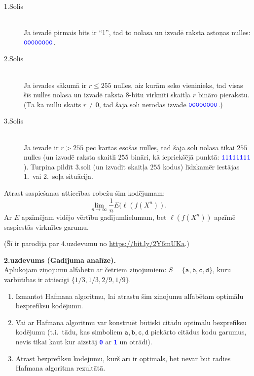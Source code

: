 \documentclass[a4paper,12pt]{article}
\begin{document}
\begin{description}
\item[1.Solis] \hfill \\
Ja ievadē pirmais bits ir ``1'', tad to nolasa un
izvadē raksta astoņas nulles:
$\textcolor{blue}{\mathtt{00000000}}$.
\item[2.Solis] \hfill \\
Ja ievades sākumā ir $r \leq 255$ nulles, aiz kurām seko vieninieks,
tad visas šīs nulles nolasa un
izvadē raksta $8$-bitu virknīti \textendash{} skaitļa $r$ bināro pierakstu.
(Tā kā nuļļu skaits $r \neq 0$, tad šajā solī nerodas izvade $\textcolor{blue}{\mathtt{00000000}}$.)
\item[3.Solis] \hfill \\
Ja ievadē ir $r > 255$ pēc kārtas esošas nulles,
tad šajā solī nolasa tikai $255$ nulles (un izvadē raksta skaitli $255$ bināri, kā iepriekšējā punktā:
$\textcolor{blue}{\mathtt{11111111}}$). Turpina pildīt 3.soli (un izvadīt skaitļa
$255$ kodus) līdzkamēr iestājas 1.\ vai 2.\ soļa situācija.
\end{description}

Atrast saspiešanas attiecības robežu šim kodējumam:
\begin{equation}
\label{eq1}
\lim_{n \rightarrow \infty} \frac{1}{n} E(\ell(f(X^n)).
\end{equation}
Ar $E$ apzīmējam vidējo vērtību gadījumlielumam, bet
$\ell(f(X^n))$ apzīmē saspiestās virknītes garumu.


(Šī ir parodija par 4.uzdevumu no \url{https://bit.ly/2Y6mUKa}.)


\vspace{10pt}
{\bf 2.uzdevums (Gadījuma analīze).}\\
Aplūkojam ziņojumu alfabētu ar četriem ziņojumiem:
$S = \{ \mathtt{a}, \mathtt{b}, \mathtt{c}, \mathtt{d} \}$,
kuru varbūtības ir attiecīgi $\{1/3, 1/3, 2/9, 1/9\}$.

\begin{enumerate}[label=(\alph*)]
\item Izmantot Hafmana algoritmu, lai atrastu šim ziņojumu alfabētam optimālu bezprefiksu ko\-dē\-ju\-mu.
\item Vai ar Hafmana algoritmu var konstruēt bū\-tis\-ki citādu optimālu bezprefiksu kodējumu
(t.i.\ tādu, kas simboliem $\mathtt{a}, \mathtt{b}, \mathtt{c}, \mathtt{d}$
piekārto citādus kodu garumus, nevis tikai kaut kur aizstāj
\textcolor{blue}{\tt 0} ar \textcolor{blue}{\tt 1} un otrādi).
\item Atrast bezprefiksu kodējumu, kurš arī ir optimāls, bet nevar būt radies Hafmana algoritma rezultātā.
\end{enumerate}
\end{document}
